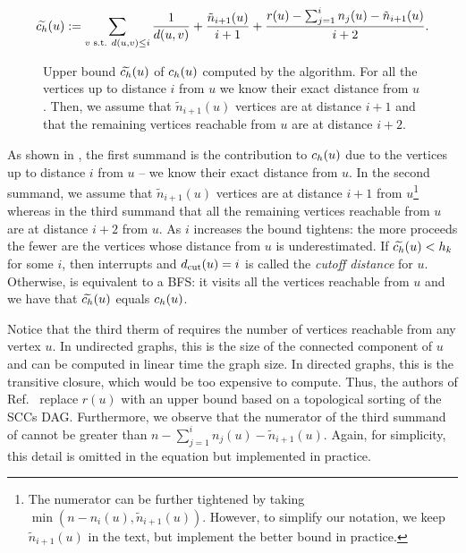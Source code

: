 \begin{equation}
\label{eq:nbcut-bound}
\widetilde{c_h}(u) := \sum_{v \text{ s.t. } d(u, v) \le i}
\frac{1}{d(u, v)} + \frac{\tilde{n}_{i + 1}(u)}{i + 1} +
\frac{r(u) - \sum_{j = 1}^i n_j(u) - \tilde{n}_{i + 1}(u)}{i + 2}.
\end{equation}

\begin{figure}[tb]
\centering

\caption{Upper bound $\widetilde{c_h}(u)$ of $c_h(u)$ computed by the \nbcut
algorithm. For all the vertices up to distance $i$ from $u$ we know their
exact distance from $u$. Then, we assume that $\tilde{n}_{i + 1}(u)$ vertices
are at distance $i + 1$ and that the remaining vertices reachable from $u$ are
at distance $i + 2$.}
\label{fig:bfscut}
\end{figure}

As shown in , the first summand is the contribution to $c_h(u)$
due to the vertices up to distance $i$ from $u$ -- we know their exact distance
from $u$. In the second summand, we assume that $\tilde{n}_{i + 1}(u)$ vertices are
at distance $i + 1$ from $u$\footnote{The numerator can be further tightened
by taking $\min(n - n_i(u), \tilde{n}_{i + 1}(u))$. However, to simplify our notation,
we keep $\tilde{n}_{i + 1}(u)$ in the text, but implement the better bound in practice.}
whereas in the third summand that all the remaining
vertices reachable from $u$ are at distance $i + 2$ from $u$.
%
As $i$ increases the bound tightens: the more \bfscut proceeds the
fewer are the vertices whose distance from $u$ is underestimated.
If $\widetilde{c_h}(u) < h_k$ for some $i$, then \nbcut interrupts \bfscut
and $d_{\text{cut}}(u) = i$ is called the \emph{cutoff distance} for $u$.
Otherwise, \bfscut is equivalent to a BFS: it visits all the vertices reachable
from $u$ and we have that $\widetilde{c_h}(u)$ equals $c_h(u)$.

Notice that the third therm of  requires the number of
vertices reachable from any vertex $u$. In undirected graphs, this is the size
of the connected component of $u$ and can be computed in linear time \wrt the
graph size.
In directed graphs, this is the transitive closure, which would be too
expensive to compute. Thus, the authors of
Ref.~\cite{DBLP:journals/tkdd/BergaminiBCMM19} replace $r(u)$ with an upper
bound based on a topological sorting of the SCCs DAG. Furthermore, we observe
that the numerator of the third summand of  cannot be
greater than $n - \sum_{j = 1}^i n_j(u) - \tilde{n}_{i + 1}(u)$. Again, for
simplicity, this detail is omitted in the equation but implemented in practice.

